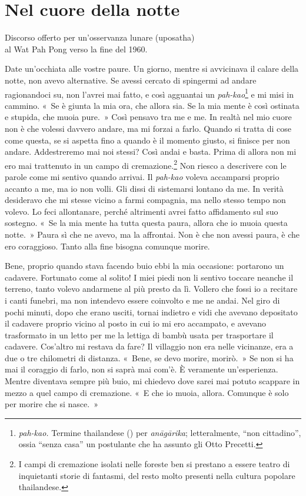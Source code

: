 \chapter{Nel cuore della notte}

\begin{openingQuote}
  \centering

  Discorso offerto per un'osservanza lunare (uposatha)\\
  al Wat Pah Pong verso la fine del 1960.
\end{openingQuote}

Date un'occhiata alle vostre paure. Un giorno, mentre si avvicinava il
calare della notte, non avevo alternative. Se avessi cercato di
spingermi ad andare ragionandoci su, non l'avrei mai fatto, e così
agguantai un \emph{pah-kao}\footnote{\emph{pah-kao.} Termine thailandese
  () per \emph{anāgārika}; letteralmente, ``non
  cittadino'', ossia ``senza casa'' un postulante che ha assunto gli
  Otto Precetti.} e mi misi in cammino. «~Se è giunta la mia ora, che
allora sia. Se la mia mente è così ostinata e stupida, che muoia pure.~»
Così pensavo tra me e me. In realtà nel mio cuore non è che volessi
davvero andare, ma mi forzai a farlo. Quando si tratta di cose come
questa, se si aspetta fino a quando è il momento giusto, si finisce per
non andare. Addestreremo mai noi stessi? Così andai e basta. Prima di
allora non mi ero mai trattenuto in un campo di cremazione.\footnote{I
  campi di cremazione isolati nelle foreste ben si prestano a essere
  teatro di inquietanti storie di fantasmi, del resto molto presenti
  nella cultura popolare thailandese.} Non riesco a descrivere con le
parole come mi sentivo quando arrivai. Il \emph{pah-kao} voleva
accamparsi proprio accanto a me, ma io non volli. Gli dissi di
sistemarsi lontano da me. In verità desideravo che mi stesse vicino a
farmi compagnia, ma nello stesso tempo non volevo. Lo feci allontanare,
perché altrimenti avrei fatto affidamento sul suo sostegno. «~Se la mia
mente ha tutta questa paura, allora che io muoia questa notte.~» Paura
sì che ne avevo, ma la affrontai. Non è che non avessi paura, è che ero
coraggioso. Tanto alla fine bisogna comunque morire.

Bene, proprio quando stava facendo buio ebbi la mia occasione: portarono
un cadavere. Fortunato come al solito! I miei piedi non li sentivo
toccare neanche il terreno, tanto volevo andarmene al più presto da lì.
Vollero che fossi io a recitare i canti funebri, ma non intendevo essere
coinvolto e me ne andai. Nel giro di pochi minuti, dopo che erano
usciti, tornai indietro e vidi che avevano depositato il cadavere
proprio vicino al posto in cui io mi ero accampato, e avevano
trasformato in un letto per me la lettiga di bambù usata per trasportare
il cadavere. Cos'altro mi restava da fare? Il villaggio non era nelle
vicinanze, era a due o tre chilometri di distanza. «~Bene, se devo
morire, morirò.~» Se non si ha mai il coraggio di farlo, non si saprà
mai com'è. È veramente un'esperienza. Mentre diventava sempre più buio,
mi chiedevo dove sarei mai potuto scappare in mezzo a quel campo di
cremazione. «~E che io muoia, allora. Comunque è solo per morire che si
nasce.~»


